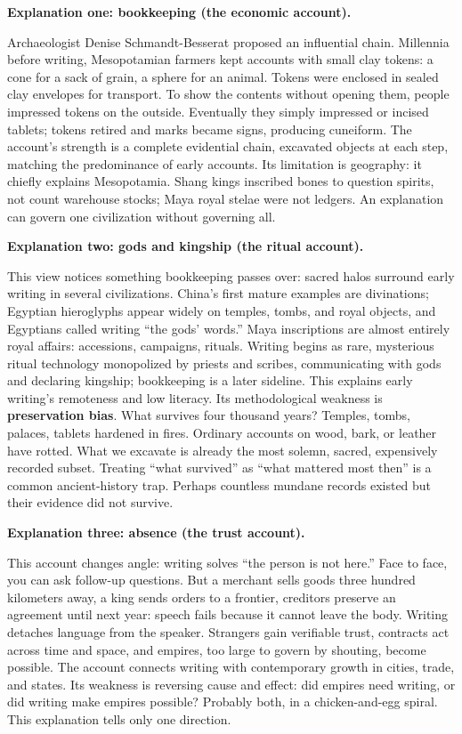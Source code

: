 \textbf{Explanation one: bookkeeping (the economic account).}

Archaeologist Denise Schmandt-Besserat proposed an influential chain. Millennia before writing, Mesopotamian farmers kept accounts with small clay tokens: a cone for a sack of grain, a sphere for an animal. Tokens were enclosed in sealed clay envelopes for transport. To show the contents without opening them, people impressed tokens on the outside. Eventually they simply impressed or incised tablets; tokens retired and marks became signs, producing cuneiform. The account's strength is a complete evidential chain, excavated objects at each step, matching the predominance of early accounts. Its limitation is geography: it chiefly explains Mesopotamia. Shang kings inscribed bones to question spirits, not count warehouse stocks; Maya royal stelae were not ledgers. An explanation can govern one civilization without governing all.

\textbf{Explanation two: gods and kingship (the ritual account).}

This view notices something bookkeeping passes over: sacred halos surround early writing in several civilizations. China's first mature examples are divinations; Egyptian hieroglyphs appear widely on temples, tombs, and royal objects, and Egyptians called writing ``the gods' words.'' Maya inscriptions are almost entirely royal affairs: accessions, campaigns, rituals. Writing begins as rare, mysterious ritual technology monopolized by priests and scribes, communicating with gods and declaring kingship; bookkeeping is a later sideline. This explains early writing's remoteness and low literacy. Its methodological weakness is \textbf{preservation bias}. What survives four thousand years? Temples, tombs, palaces, tablets hardened in fires. Ordinary accounts on wood, bark, or leather have rotted. What we excavate is already the most solemn, sacred, expensively recorded subset. Treating ``what survived'' as ``what mattered most then'' is a common ancient-history trap. Perhaps countless mundane records existed but their evidence did not survive.

\textbf{Explanation three: absence (the trust account).}

This account changes angle: writing solves ``the person is not here.'' Face to face, you can ask follow-up questions. But a merchant sells goods three hundred kilometers away, a king sends orders to a frontier, creditors preserve an agreement until next year: speech fails because it cannot leave the body. Writing detaches language from the speaker. Strangers gain verifiable trust, contracts act across time and space, and empires, too large to govern by shouting, become possible. The account connects writing with contemporary growth in cities, trade, and states. Its weakness is reversing cause and effect: did empires need writing, or did writing make empires possible? Probably both, in a chicken-and-egg spiral. This explanation tells only one direction.

